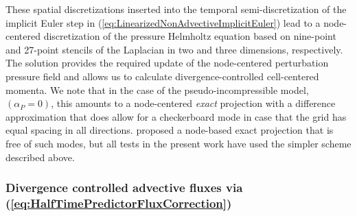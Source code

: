 \documentclass{ametsoc}
\theoremstyle{definition}
\newcommand{\eq}[1]{(\ref{#1})}
\newcommand{\apsinc}{\alpha_{P}}
\begin{document}
These spatial discretizations inserted into the temporal semi-discretization
of the implicit Euler step in \eq{eq:LinearizedNonAdvectiveImplicitEuler}
lead to a node-centered discretization of the pressure Helmholtz 
equation based on nine-point and 27-point stencils of the Laplacian in two 
and three dimensions, respectively. The solution provides the required update 
of the node-centered perturbation pressure field and allows us to 
calculate divergence-controlled cell-centered momenta. We note that in the case of the
pseudo-incompressible model, $(\apsinc = 0)$, this amounts to a node-centered 
\emph{exact} projection with a difference approximation that does allow for a 
checkerboard mode in case that the grid has equal spacing in all directions.\citet{VaterKlein2009} proposed a node-based exact projection that is free of
such modes, but all tests in the present work have used the simpler scheme 
described above.


\subsubsection{Divergence controlled advective fluxes via 
\eq{eq:HalfTimePredictorFluxCorrection}}
\label{sssec:DivControlledAdvectiveFluxes}
\end{document}
